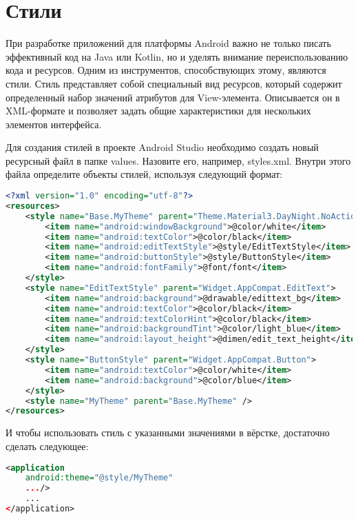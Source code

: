 \section{Стили}

При разработке приложений для платформы Android важно не только писать
эффективный код на Java или Kotlin, но и уделять внимание переиспользованию
кода и ресурсов. Одним из инструментов, способствующих этому, являются стили.
Стиль представляет собой специальный вид ресурсов, который содержит
определенный набор значений атрибутов для View-элемента.
Описывается он в XML-формате и позволяет задать общие характеристики
для нескольких элементов интерфейса.\par
Для создания стилей в проекте Android Studio необходимо создать
новый ресурсный файл в папке values. Назовите его, например, styles.xml.
Внутри этого файла определите объекты стилей, используя следующий формат:

\begin{lstlisting}[language=XML]
<?xml version="1.0" encoding="utf-8"?>
<resources>
    <style name="Base.MyTheme" parent="Theme.Material3.DayNight.NoActionBar">
        <item name="android:windowBackground">@color/white</item>
        <item name="android:textColor">@color/black</item>
        <item name="android:editTextStyle">@style/EditTextStyle</item>
        <item name="android:buttonStyle">@style/ButtonStyle</item>
        <item name="android:fontFamily">@font/font</item>
    </style>
    <style name="EditTextStyle" parent="Widget.AppCompat.EditText">
        <item name="android:background">@drawable/edittext_bg</item>
        <item name="android:textColor">@color/black</item>
        <item name="android:textColorHint">@color/black</item>
        <item name="android:backgroundTint">@color/light_blue</item>
        <item name="android:layout_height">@dimen/edit_text_height</item>
    </style>
    <style name="ButtonStyle" parent="Widget.AppCompat.Button">
        <item name="android:textColor">@color/white</item>
        <item name="android:background">@color/blue</item>
    </style>
    <style name="MyTheme" parent="Base.MyTheme" />
</resources>
\end{lstlisting}

И чтобы использовать стиль с указанными значениями в вёрстке,
достаточно сделать следующее:

\begin{lstlisting}[language=XML]
<application
	android:theme="@style/MyTheme"
	.../>
	...
</application>
\end{lstlisting}

